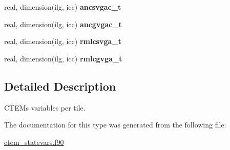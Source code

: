 \begin{DoxyCompactItemize}
\item 
\hypertarget{structctem__statevars_1_1ctem__tile__level_ac13e8be66b89cb28bad06cf9e060ba18}{}real, dimension(ilg, icc) {\bfseries ancsvgac\+\_\+t}\label{structctem__statevars_1_1ctem__tile__level_ac13e8be66b89cb28bad06cf9e060ba18}

\item 
\hypertarget{structctem__statevars_1_1ctem__tile__level_a08f95976b8e4799e422027e8b73bf34b}{}real, dimension(ilg, icc) {\bfseries ancgvgac\+\_\+t}\label{structctem__statevars_1_1ctem__tile__level_a08f95976b8e4799e422027e8b73bf34b}

\item 
\hypertarget{structctem__statevars_1_1ctem__tile__level_a5ffc637f55e57a3b600df1bd21794ad1}{}real, dimension(ilg, icc) {\bfseries rmlcsvga\+\_\+t}\label{structctem__statevars_1_1ctem__tile__level_a5ffc637f55e57a3b600df1bd21794ad1}

\item 
\hypertarget{structctem__statevars_1_1ctem__tile__level_ad71adfbf5bb76a25209cfe256ca52a79}{}real, dimension(ilg, icc) {\bfseries rmlcgvga\+\_\+t}\label{structctem__statevars_1_1ctem__tile__level_ad71adfbf5bb76a25209cfe256ca52a79}

\end{DoxyCompactItemize}


\subsection{Detailed Description}
C\+T\+E\+M\textquotesingle{}s variables per tile. 

The documentation for this type was generated from the following file\+:\begin{DoxyCompactItemize}
\item 
\hyperlink{ctem__statevars_8f90}{ctem\+\_\+statevars.\+f90}\end{DoxyCompactItemize}
